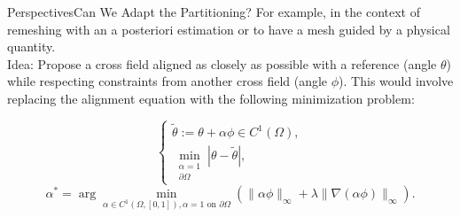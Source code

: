 \documentclass[compress,10pt,aspectratio=169]{beamer}
\begin{document}
\begin{frame}{Perspectives}{Can We Adapt the Partitioning?}
\small
For example, in the context of remeshing with an a posteriori estimation or to have a mesh guided by a physical quantity.\\\vspace{0.3cm}
Idea: Propose a cross field aligned as closely as possible with a reference (angle $\theta$) while respecting constraints from another cross field (angle $\phi$). This would involve replacing the alignment equation with the following minimization problem:\\\vspace{0.3cm}

\begin{equation*}
\begin{cases}
    \tilde{\theta} := \theta + \alpha\phi \in C^1(\Omega), \\
    \min_{\substack{\alpha=1 \\ \partial\Omega}} \left\lvert \theta - \tilde{\theta} \right\rvert,
\end{cases}
\end{equation*}
$$
\alpha^* = \arg\min_{\alpha\in C^1(\Omega,[0,1]), \alpha=1 \text{ on } \partial\Omega} \left( \lVert \alpha\phi \rVert_\infty + \lambda \lVert \nabla (\alpha\phi) \rVert_\infty \right).
$$
\end{frame}
\end{document}
